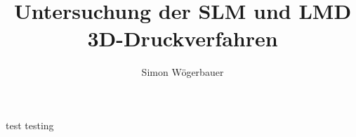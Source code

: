\documentclass[12pt]{article}
\title{Untersuchung der SLM und LMD 3D-Druckverfahren}
\author{Simon Wögerbauer}
\begin{document}

test
\cite{gupta20193d}
testing
\printbibliography
\end{document}
